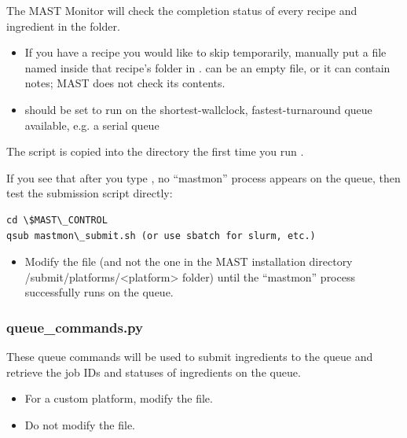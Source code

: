 \documentclass[letterpaper,10pt,english]{sphinxmanual}
\begin{document}
The MAST Monitor will check the completion status of every recipe and ingredient in the  folder.
\begin{itemize}
\item {} 
If you have a recipe you would like to skip temporarily, manually put a file named  inside that recipe's folder in .  can be an empty file, or it can contain notes; MAST does not check its contents.

\item {} 
 should be set to run on the shortest-wallclock, fastest-turnaround queue available, e.g. a serial queue

\end{itemize}

The  script is copied into the  directory the first time you run .

If you see that after you type , no ``mastmon'' process appears on the queue, then test the submission script directly:

\begin{Verbatim}[commandchars=\\\{\}]
cd \$MAST\_CONTROL
qsub mastmon\_submit.sh (or use sbatch for slurm, etc.)
\end{Verbatim}
\begin{itemize}
\item {} 
Modify the  file (and not the one in the MAST installation directory /submit/platforms/\textless{}platform\textgreater{} folder) until the ``mastmon'' process successfully runs on the queue.

\end{itemize}


\subsubsection{queue\_commands.py}
\label{1_0_installation:queue-commands-py}
These queue commands will be used to submit ingredients to the queue and retrieve the job IDs and statuses of ingredients on the queue.
\begin{itemize}
\item {} 
For a custom platform, modify the  file.

\item {} 
Do not modify the  file.

\end{itemize}
\end{document}
